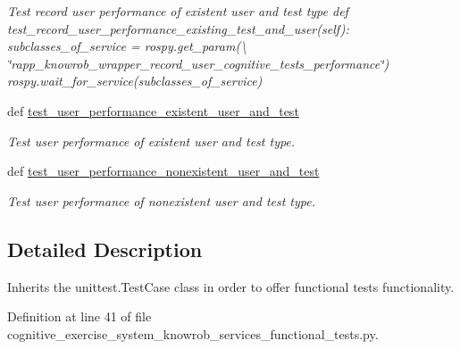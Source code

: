 \begin{DoxyCompactItemize}
\begin{DoxyCompactList}\small\item\em Test record user performance of existent user and test type def test\-\_\-record\-\_\-user\-\_\-performance\-\_\-existing\-\_\-test\-\_\-and\-\_\-user(self)\-: subclasses\-\_\-of\-\_\-service = rospy.\-get\-\_\-param(\textbackslash{} \char`\"{}rapp\-\_\-knowrob\-\_\-wrapper\-\_\-record\-\_\-user\-\_\-cognitive\-\_\-tests\-\_\-performance\char`\"{}) rospy.\-wait\-\_\-for\-\_\-service(subclasses\-\_\-of\-\_\-service) \end{DoxyCompactList}\item 
def \hyperlink{classcognitive__exercise__system__knowrob__services__functional__tests_1_1OntologyFunc_a7589b1b87bf171a7b19fb1620e689c4b}{test\-\_\-user\-\_\-performance\-\_\-existent\-\_\-user\-\_\-and\-\_\-test}
\begin{DoxyCompactList}\small\item\em Test user performance of existent user and test type. \end{DoxyCompactList}\item 
def \hyperlink{classcognitive__exercise__system__knowrob__services__functional__tests_1_1OntologyFunc_ad697dd9b6de9014f73d1deda76e17abf}{test\-\_\-user\-\_\-performance\-\_\-nonexistent\-\_\-user\-\_\-and\-\_\-test}
\begin{DoxyCompactList}\small\item\em Test user performance of nonexistent user and test type. \end{DoxyCompactList}\end{DoxyCompactItemize}


\subsection{Detailed Description}
Inherits the unittest.\-Test\-Case class in order to offer functional tests functionality. 

Definition at line 41 of file cognitive\-\_\-exercise\-\_\-system\-\_\-knowrob\-\_\-services\-\_\-functional\-\_\-tests.\-py.



